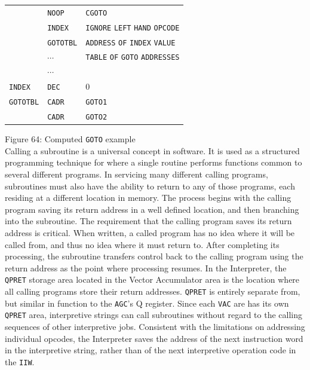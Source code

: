 \documentclass[refcap, oxford]{ahsan}
\begin{document}
\begin{center}
\begin{tabular}{lll}
 & \texttt{NOOP} & \texttt{CGOTO} \\
 & \texttt{INDEX} & \texttt{IGNORE} \texttt{LEFT} \texttt{HAND} \texttt{OPCODE} \\
 & \texttt{GOTOTBL} & \texttt{ADDRESS} \texttt{OF} \texttt{INDEX} \texttt{VALUE} \\
 & $\cdots$ & \texttt{TABLE} \texttt{OF} \texttt{GOTO} \texttt{ADDRESSES} \\
 & $\cdots$ &  \\
\texttt{INDEX} & \texttt{DEC} & 0 \\
\texttt{GOTOTBL} & \texttt{CADR} & \texttt{GOTO1} \\
 & \texttt{CADR} & \texttt{GOTO2} \\
\end{tabular}
\end{center}

Figure 64: Computed \texttt{GOTO} example\\
Calling a subroutine is a universal concept in software. It is used as a structured programming technique for where a single routine performs functions common to several different programs. In servicing many different calling programs, subroutines must also have the ability to return to any of those programs, each residing at a different location in memory. The process begins with the calling program saving its return address in a well defined location, and then branching into the subroutine. The requirement that the calling program saves its return address is critical. When written, a called program has no idea where it will be called from, and thus no idea where it must return to. After completing its processing, the subroutine transfers control back to the calling program using the return address as the point where processing resumes. In the Interpreter, the \texttt{QPRET} storage area located in the Vector Accumulator area is the location where all calling programs store their return addresses. \texttt{QPRET} is entirely separate from, but similar in function to the \texttt{AGC}'s Q register. Since each \texttt{VAC} are has its own \texttt{QPRET} area, interpretive strings can call subroutines without regard to the calling sequences of other interpretive jobs. Consistent with the limitations on addressing individual opcodes, the Interpreter saves the address of the next instruction word in the interpretive string, rather than of the next interpretive operation code in the \texttt{IIW}.
\end{document}
